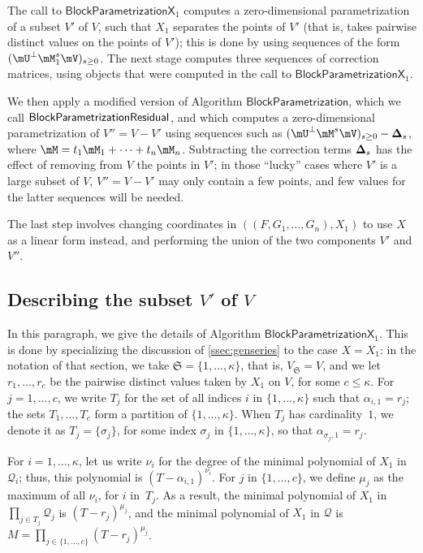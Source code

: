 \documentclass[12pt]{article}
\newcommand{\mat}[1]{\bm{\MakeUppercase{#1}}} %
\newcommand{\mainalgoname}{\mathsf{ BlockParametrization}}
\newcommand{\lf}{X}
\newcommand{\residueI}{\mathscr{Q}}
\def\dg{\kappa}
\begin{document}
The call to $\mathsf{BlockParametrizationX}_1$ computes a zero-dimensional
parametrization of a subset $V'$ of $V$, such that $X_1$ separates the
points of $V'$ (that is, takes pairwise distinct values on the points
of $V'$); this is done by using sequences of the form $(\mU^\perp
\mM_1^s \mV)_{s \ge 0}$. The next stage computes three 
sequences of correction matrices, using objects that were computed 
in the call to  $\mathsf{BlockParametrizationX}_1$.

We then apply a modified version of Algorithm $\mainalgoname$, which we call
$\mainalgoname{\sf Residual}$, and which computes a zero-dimensional
parametrization of $V''=V-V'$ using sequences such as $(\mU^\perp
\mM^s \mV)_{s \ge 0} - \mat{\Delta}_s$, where $\mM= t_1 \mM_1 + \cdots
+ t_n \mM_n$. Subtracting the correction terms $\mat{\Delta}_s$ has
the effect of removing from $V$ the points in $V'$; in those ``lucky''
cases where $V'$ is a large subset of $V$, $V''=V-V'$ may only contain
a few points, and few values for the latter sequences will be needed.

The last step involves changing coordinates in
$((F,G_1,\dots,G_n),X_1)$ to use $\lf$ as a linear form instead, and
performing the union of the two components $V'$ and $V''$.


\subsection{Describing the subset \texorpdfstring{$V'$}{V'} of \texorpdfstring{$V$}{V}}

In this paragraph, we give the details of Algorithm
$\mathsf{BlockParametrizationX}_1$. This is done by specializing the
discussion of \cref{ssec:genseries} to the case $\lf=X_1$:
in the notation of that section, we take
$\mathfrak{S}=\{1,\dots,\dg\}$, that is, $V_{\mathfrak{S}}=V$, and we
let $r_1,\dots,r_c$ be the pairwise distinct values taken by $X_1$ on
$V$, for some $c \le \dg$.  For $j=1,\dots,c$, we write $T_j$ for the
set of all indices $i$ in $\{1,\dots,\dg\}$ such that
$\alpha_{i,1}=r_j$; the sets $T_1,\dots,T_c$ form a partition of
$\{1,\dots,\dg\}$. When $T_j$ has cardinality~$1$, we denote it as
$T_j=\{\sigma_j\}$, for some index $\sigma_j$ in $\{1,\dots,\dg\}$, so
that $\alpha_{\sigma_j,1}=r_j$.

For $i=1,\dots,\dg$, let us write $\nu_i$ for the degree of the minimal
polynomial of $X_1$ in $\residueI_i$; thus, this polynomial is
$(T-\alpha_{i,1})^{\nu_i}$. For $j$ in $\{1,\dots,c\}$, we define
$\mu_j$ as the maximum of all $\nu_i$, for $i$ in~$T_j$. As a result, the minimal
polynomial of $X_1$ in $\prod_{j \in T_j} \residueI_j$ is 
$(T-r_j)^{\mu_j}$, and the minimal polynomial of $X_1$ in $\residueI$ is
$M=\prod_{j \in \{1,\dots,c\}} (T-r_j)^{\mu_j}$.
\end{document}
